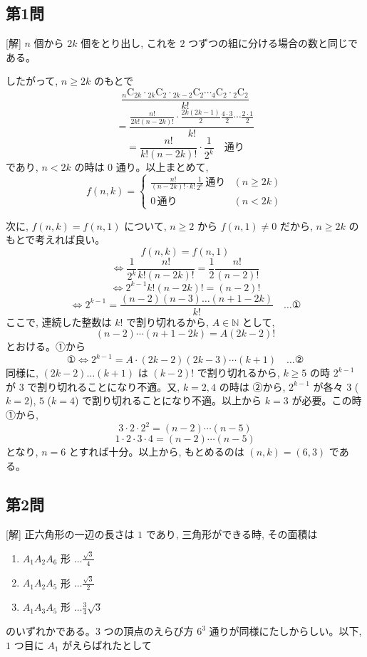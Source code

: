 \documentclass[../main.tex]{subfiles}
\begin{document}
\subsection*{第1問}

[解] $n$ 個から $2k$ 個をとり出し, これを $2$ つずつの組に分ける場合の数と同じである。

したがって, $n \ge 2k$ のもとで
\[
  \frac{{}_n\mathrm{C}_{2k} \cdot {}_{2k}\mathrm{C}_2 \cdot {}_{2k-2}\mathrm{C}_2 \cdots {}_4\mathrm{C}_2 \cdot {}_2\mathrm{C}_2}{k!}
\]
\[
  = \frac{\frac{n!}{2k!(n-2k)!} \cdot \frac{2k(2k-1)}{2} \frac{4\cdot 3}{2} \cdots \frac{2\cdot 1}{2}}{k!}
\]
\[
  = \frac{n!}{k!(n-2k)!} \cdot \frac{1}{2^k} \quad \text{通り}
\]
であり, $n < 2k$ の時は $0$ 通り。以上まとめて,
\[
  f(n, k) =
  \begin{cases}
    \frac{n!}{(n-2k)! \cdot k!} \frac{1}{2^k} \, \text{通り} & (n \ge 2k) \\
    0 \, \text{通り} & (n < 2k)
  \end{cases}
\]

次に, $f(n, k) = f(n, 1)$ について, $n \ge 2$ から $f(n, 1) \neq 0$ だから, $n \ge 2k$ のもとで考えれば良い。
\[
  f(n, k) = f(n, 1)
\]
\[
  \iff \frac{1}{2^k} \frac{n!}{k!(n-2k)!} = \frac{1}{2} \frac{n!}{(n-2)!}
\]
\[
  \iff 2^{k-1} k! (n-2k)! = (n-2)!
\]
\[
  \iff 2^{k-1} = \frac{(n-2)(n-3) \dots (n+1-2k)}{k!} \quad \dots \text{①}
\]
ここで, 連続した整数は $k!$ で割り切れるから, $A \in \mathbb{N}$ として,
\[
  (n-2) \cdots (n+1-2k) = A(2k-2)!
\]
とおける。①から
\[
  \text{①} \iff 2^{k-1} = A \cdot (2k-2)(2k-3) \cdots (k+1) \quad \dots \text{②}
\]
同様に, $(2k-2) \dots (k+1)$ は $(k-2)!$ で割り切れるから, $k \ge 5$ の時 $2^{k-1}$ が $3$ で割り切れることになり不適。又, $k=2, 4$ の時は ②から, $2^{k-1}$ が各々 $3$ ($k=2$), $5$ ($k=4$) で割り切れることになり不適。以上から $k=3$ が必要。この時①から,
\[
  3 \cdot 2 \cdot 2^2 = (n-2) \cdots (n-5)
\]
\[
  1 \cdot 2 \cdot 3 \cdot 4 = (n-2) \cdots (n-5)
\]
となり, $n=6$ とすれば十分。以上から, もとめるのは $(n, k) = (6, 3)$ である。

\subsection*{第2問}

[解] 正六角形の一辺の長さは $1$ であり, 三角形ができる時, その面積は
\begin{enumerate}
  \item[$1^\circ$] $A_1 A_2 A_6$ 形 $\dots \frac{\sqrt{3}}{4}$
  \item[$2^\circ$] $A_1 A_2 A_5$ 形 $\dots \frac{\sqrt{3}}{2}$
  \item[$3^\circ$] $A_1 A_3 A_5$ 形 $\dots \frac{3}{4}\sqrt{3}$
\end{enumerate}
のいずれかである。$3$ つの頂点のえらび方 $6^3$ 通りが同様にたしからしい。以下, $1$ つ目に $A_1$ がえらばれたとして
\end{document}
